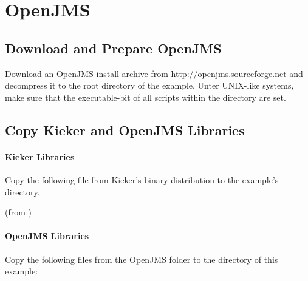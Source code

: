 \section{OpenJMS}\label{example:jms:openjms}

\subsection{Download and Prepare OpenJMS}

Download an OpenJMS install archive from \url{http://openjms.sourceforge.net} %
and decompress it to the root directory of the example. Unter UNIX-like systems, make sure that the executable-bit of all scripts within the  directory are set.

\subsection{Copy Kieker and OpenJMS Libraries}

\paragraph*{Kieker Libraries}

Copy the following file from Kieker's binary distribution to %
the example's  directory.

\medskip

\begin{compactenum}
 \item \file{\mainJarEMF} (from )
\end{compactenum}

\paragraph*{OpenJMS Libraries}

Copy the following files from the OpenJMS  folder to the %
 directory of this example:

\medskip

\begin{compactenum}
\item {}
\item {}
\item {}
\item {}
\item {}
\item {}
\end{compactenum}

